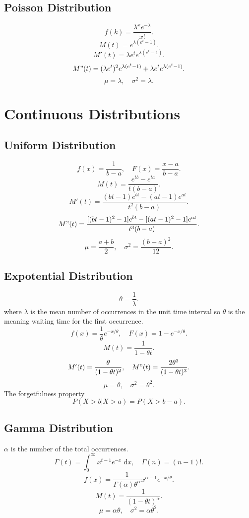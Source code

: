 \documentclass[10pt,landscape,a4paper]{article}
\begin{document}
\begin{multicols*}{5}
        \subsection*{Poisson Distribution}
        \[
                f(k)=\frac{\lambda^x e^{-\lambda}}{x!}
        .\] 
        \[
                M(t)=e^{\lambda (e^t-1)}
        .\]
        \[
                M'(t)=\lambda e^t e^{\lambda(e^t-1)}
        .\] 
        \[
                M"(t)=(\lambda e^t)^2 e^{\lambda(e^t-1)}
                +\lambda e^t e^{\lambda(e^t-1)}
        .\]
        \[
                \mu = \lambda, \quad
                \sigma^2 = \lambda
        .\] 
        \section*{Continuous Distributions}
        \subsection*{Uniform Distribution}
        \[
                f(x)=\frac{1}{b-a}, \quad
                F(x)=\frac{x-a}{b-a}
        .\]
        \[
                M(t)=\frac{e^{tb}-e^{ta}}{t(b-a)}
        .\] 
        \[
                M'(t)=\frac{(bt-1)e^{bt}-(at-1)e^{at}}{t^2(b-a)}
        .\]
        \[
                M"(t)=\frac{[(bt-1)^2-1]e^{bt}-[(at-1)^2-1]e^{at}}{t^3(b-a)}
        .\] 
        \[
                \mu = \frac{a+b}{2}, \quad
                \sigma^2 = \frac{(b-a)^2}{12} 
        .\]
        \subsection*{Expotential Distribution}
        \[
                \theta = \frac{1}{\lambda}
        .\]
        where $\lambda$ is the mean number of occurrences in the unit time interval
        so $\theta$ is the meaning waiting time for the first occurrence.
        \[
                f(x)=\frac{1}{\theta}e^{-x / \theta}, \quad
                F(x)=1-e^{-x / \theta}
        .\]
        \[
                M(t)=\frac{1}{1-\theta t}
        .\] 
        \[
                M'(t)=\frac{\theta}{(1-\theta t)^2}, \quad 
                M"(t)=\frac{2 \theta^2}{(1-\theta t)^3}
        .\] 
        \[
                \mu = \theta, \quad
                \sigma^2 = \theta^2
        .\]
        The forgetfulness property
        \[
                P(X>b | X>a) = P(X>b-a)
        .\] 
        \subsection*{Gamma Distribution}
        $\alpha$ is the number of the total occurrences.
        \[
                \Gamma (t) = \int_0^\infty x^{t-1} e^{-x} \; \mathrm d x, \quad
                \Gamma (n) = (n-1)!
        .\] 
        \[
                f(x) = \frac{1}{\Gamma (\alpha) \theta^\alpha} 
                x^{\alpha-1} e^{-x / \theta}
        .\] 
        \[ 
                M(t)=\frac{1}{(1-\theta t)^\alpha}
        .\] 
        \[
                \mu = \alpha \theta, \quad
                \sigma^2 = \alpha \theta^2
        .\]

\end{multicols*}
\end{document}
